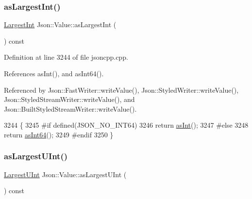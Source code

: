 \mbox{\label{class_json_1_1_value_ab16f2ea2a117a1b3b576acab8b6a700d}} 
\subsubsection{\texorpdfstring{as\+Largest\+Int()}{asLargestInt()}}
{\footnotesize\ttfamily \hyperlink{class_json_1_1_value_a1cbb82642ed05109b9833e49f042ece7}{Largest\+Int} Json\+::\+Value\+::as\+Largest\+Int (\begin{DoxyParamCaption}{ }\end{DoxyParamCaption}) const}



Definition at line 3244 of file jsoncpp.\+cpp.



References as\+Int(), and as\+Int64().



Referenced by Json\+::\+Fast\+Writer\+::write\+Value(), Json\+::\+Styled\+Writer\+::write\+Value(), Json\+::\+Styled\+Stream\+Writer\+::write\+Value(), and Json\+::\+Built\+Styled\+Stream\+Writer\+::write\+Value().


\begin{DoxyCode}
3244                                      \{
3245 \textcolor{preprocessor}{#if defined(JSON\_NO\_INT64)}
3246   \textcolor{keywordflow}{return} \hyperlink{class_json_1_1_value_a614d635bc248a592593feb322cd15ab8}{asInt}();
3247 \textcolor{preprocessor}{#else}
3248   \textcolor{keywordflow}{return} \hyperlink{class_json_1_1_value_aa647ac4fe51a2e325c063ebe32262b44}{asInt64}();
3249 \textcolor{preprocessor}{#endif}
3250 \}
\end{DoxyCode}
\mbox{\label{class_json_1_1_value_ad03548101e0bf3d2d9eac75c64a0b8d7}} 
\subsubsection{\texorpdfstring{as\+Largest\+U\+Int()}{asLargestUInt()}}
{\footnotesize\ttfamily \hyperlink{class_json_1_1_value_a6682a3684d635e03fc06ba229fa24eec}{Largest\+U\+Int} Json\+::\+Value\+::as\+Largest\+U\+Int (\begin{DoxyParamCaption}{ }\end{DoxyParamCaption}) const}



